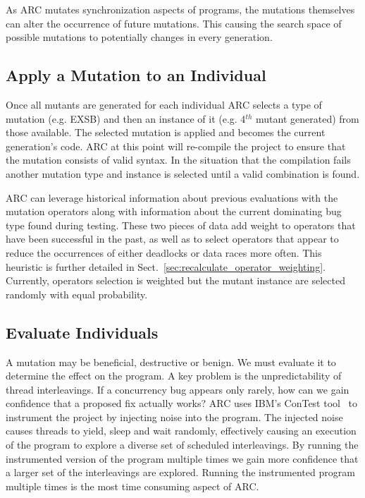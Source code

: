 \documentclass{llncs}
\begin{document}
As ARC mutates synchronization aspects of programs, the mutations themselves
can alter the occurrence of future mutations. This causing the search space of
possible mutations to potentially changes in every generation.

\subsection{Apply a Mutation to an Individual}
\label{sec:mutate_individuals}

Once all mutants are generated for each individual ARC selects a type of
mutation (e.g. EXSB) and then an instance of
it (e.g. 4$^{th}$ mutant generated) from those available. The
selected mutation is applied and becomes the current
generation's code. ARC at this point will re-compile the project to ensure that
the mutation consists of valid syntax. In the situation that the compilation
fails another mutation type and instance is selected until a valid combination is
found.

ARC can leverage historical information about previous evaluations with the
mutation operators along with information about the current dominating bug type
found during testing. These two pieces of data add weight to operators
that have been successful in the past, as well as to select operators that
appear to reduce the occurrences of either deadlocks or data races more often.
This heuristic is further detailed in
Sect.~\ref{sec:recalculate_operator_weighting}. Currently, operators selection is weighted but the mutant instance are selected randomly with equal probability.

\subsection{Evaluate Individuals}
\label{sec:evalute_individuals}

A mutation may be beneficial, destructive or benign. We must evaluate it to
determine the effect on the program. A key problem is the unpredictability of
thread interleavings. If a concurrency bug appears only rarely, how can we gain
confidence that a proposed fix actually works? ARC uses IBM's ConTest
tool~\cite{EFN+02} to instrument the project by injecting noise into the
program. The injected noise causes threads to yield, sleep and wait randomly,
effectively causing an execution of the program to explore a diverse set of
scheduled interleavings. By running the instrumented version of the
program multiple times we gain more confidence that a larger set of the
interleavings are explored. Running the instrumented program multiple times is
the most time consuming aspect of ARC.
\end{document}

